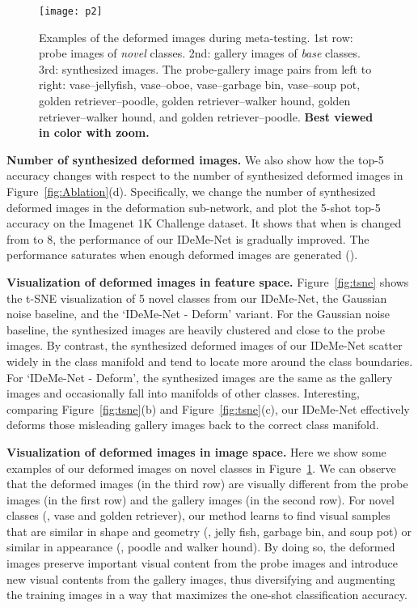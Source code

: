 \documentclass[10pt,letterpaper,twocolumn]{article}
\begin{document}
\noindent 


\begin{figure}[h]
\begin{centering}
		\texttt{[image: p2]}
		\par\end{centering}
\vspace{0.1in}
	\caption{\label{fig:example}{Examples of the deformed images during meta-testing. 1st row: probe images of {\em novel} classes. 2nd: gallery images of {\em base} classes. 3rd: synthesized images. The  probe-gallery image pairs from left to right: 
				vase--jellyfish, vase--oboe, vase--garbage bin, vase--soup pot, golden retriever--poodle, golden retriever--walker hound, golden retriever--walker hound, and golden retriever--poodle. \textbf{Best viewed in color with zoom.}}}
\end{figure}

\noindent \textbf{Number of synthesized deformed images.} We also
show how the top-5 accuracy changes with respect to the number of
synthesized deformed images in Figure~\ref{fig:Ablation}(d). Specifically,
we change the number of synthesized deformed images  in
the deformation sub-network, and plot the 5-shot top-5 accuracy
on the Imagenet 1K Challenge dataset. It shows that when  is changed
from  to 8, the performance of our IDeMe-Net is gradually improved.
The performance saturates when enough deformed images
are generated ().

\noindent \textbf{Visualization of deformed images in feature space.} Figure~\ref{fig:tsne} shows the t-SNE
\cite{tsne} visualization of 5 novel classes from our IDeMe-Net,
the Gaussian noise baseline, and the `IDeMe-Net - Deform' variant. For the Gaussian noise
baseline, the synthesized images are heavily clustered and
close to the probe images. By contrast, the synthesized deformed images
of our IDeMe-Net scatter widely in the class manifold and tend to
locate more around the class boundaries. For `IDeMe-Net - Deform',
the synthesized images are the same as the gallery images
and occasionally fall into manifolds of other classes. Interesting,
comparing Figure~\ref{fig:tsne}(b) and Figure~\ref{fig:tsne}(c), our
IDeMe-Net effectively deforms those misleading gallery images back
to the correct class manifold.

\noindent \textbf{Visualization of deformed images in image space.} Here we show some examples of
our deformed images on novel classes in Figure~\ref{fig:example}. We can observe that the deformed images (in the third row) are visually different from the probe images (in the first row) and the gallery images (in the second row). For novel classes (\eg, vase and golden retriever), our method learns to find visual samples that are similar in shape and geometry (\eg, jelly fish, garbage bin, and soup pot) or similar in appearance (\eg, poodle and walker hound). By doing so, the deformed images preserve important visual content from the probe images and introduce new visual contents from the gallery images, thus diversifying and augmenting the training images in a way that maximizes the one-shot classification accuracy.
\end{document}
